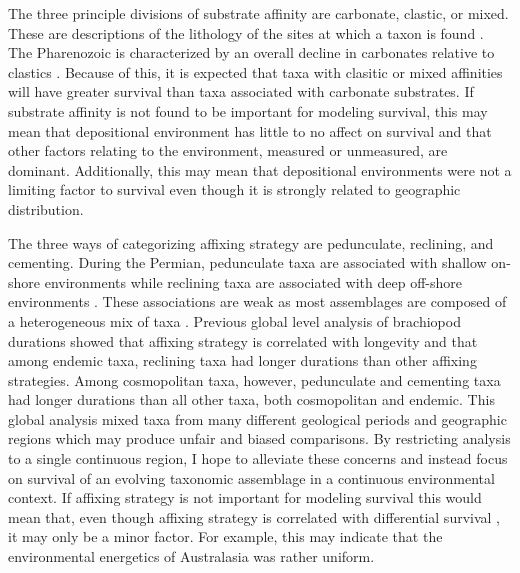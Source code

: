 \documentclass[12pt,letterpaper]{article}
\begin{document}
The three principle divisions of substrate affinity are carbonate, clastic, or mixed. These are descriptions of the lithology of the sites at which a taxon is found \citep{Foote2006,Anderson2011a,Nurnberg2013a,Kiessling2007a,Miller2001}. The Pharenozoic is characterized by an overall decline in carbonates relative to clastics \citep{Foote2006,Miller2001}. Because of this, it is expected that taxa with clasitic or mixed affinities will have greater survival than taxa associated with carbonate substrates. If substrate affinity is not found to be important for modeling survival, this may mean that depositional environment has little to no affect on survival and that other factors relating to the environment, measured or unmeasured, are dominant. Additionally, this may mean that depositional environments were not a limiting factor to survival even though it is strongly related to geographic distribution. 

The three ways of categorizing affixing strategy are pedunculate, reclining, and cementing. During the Permian, pedunculate taxa are associated with shallow on-shore environments while reclining taxa are associated with deep off-shore environments \citep{Clapham2007}. These associations are weak as most assemblages are composed of a heterogeneous mix of taxa \citep{Clapham2007}. Previous global level analysis of brachiopod durations showed that affixing strategy is correlated with longevity \citep{Alexander1977} and that among endemic taxa, reclining taxa had longer durations than other affixing strategies. Among cosmopolitan taxa, however, pedunculate and cementing taxa had longer durations than all other taxa, both cosmopolitan and endemic. This global analysis mixed taxa from many different geological periods and geographic regions which may produce unfair and biased comparisons. By restricting analysis to a single continuous region, I hope to alleviate these concerns and instead focus on survival of an evolving taxonomic assemblage in a continuous environmental context. If affixing strategy is not important for modeling survival this would mean that, even though affixing strategy is correlated with differential survival \citep{Alexander1977}, it may only be a minor factor. For example, this may indicate that the environmental energetics of Australasia was rather uniform. 
\end{document}
